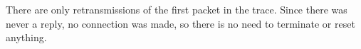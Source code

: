 There are only retransmissions of the first packet in the trace. Since there was never a reply, no connection was made, so there is no need to terminate or reset anything.